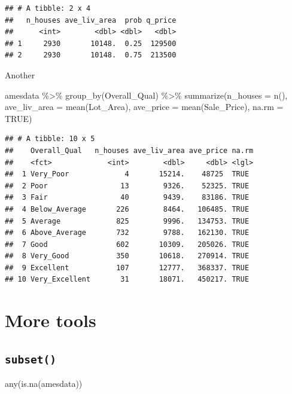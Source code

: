 \documentclass[
]{book}
\newenvironment{Shaded}{\begin{snugshade}}{\end{snugshade}}
\newcommand{\AttributeTok}[1]{\textcolor[rgb]{0.77,0.63,0.00}{#1}}
\newcommand{\ConstantTok}[1]{\textcolor[rgb]{0.00,0.00,0.00}{#1}}
\newcommand{\FunctionTok}[1]{\textcolor[rgb]{0.00,0.00,0.00}{#1}}
\newcommand{\NormalTok}[1]{#1}
\newcommand{\SpecialCharTok}[1]{\textcolor[rgb]{0.00,0.00,0.00}{#1}}
\theoremstyle{definition}
\theoremstyle{definition}
\theoremstyle{definition}
\theoremstyle{definition}
\theoremstyle{remark}
\begin{document}
\begin{verbatim}
## # A tibble: 2 x 4
##   n_houses ave_liv_area  prob q_price
##      <int>        <dbl> <dbl>   <dbl>
## 1     2930       10148.  0.25  129500
## 2     2930       10148.  0.75  213500
\end{verbatim}

Another

\begin{Shaded}
\begin{Highlighting}[]
\NormalTok{amesdata }\SpecialCharTok{\%\textgreater{}\%} 
  \FunctionTok{group\_by}\NormalTok{(Overall\_Qual) }\SpecialCharTok{\%\textgreater{}\%} 
  \FunctionTok{summarize}\NormalTok{(}\AttributeTok{n\_houses =} \FunctionTok{n}\NormalTok{(),}
            \AttributeTok{ave\_liv\_area =} \FunctionTok{mean}\NormalTok{(Lot\_Area),}
            \AttributeTok{ave\_price =} \FunctionTok{mean}\NormalTok{(Sale\_Price),}
            \AttributeTok{na.rm =} \ConstantTok{TRUE}\NormalTok{)}
\end{Highlighting}
\end{Shaded}

\begin{verbatim}
## # A tibble: 10 x 5
##    Overall_Qual   n_houses ave_liv_area ave_price na.rm
##    <fct>             <int>        <dbl>     <dbl> <lgl>
##  1 Very_Poor             4       15214.    48725  TRUE 
##  2 Poor                 13        9326.    52325. TRUE 
##  3 Fair                 40        9439.    83186. TRUE 
##  4 Below_Average       226        8464.   106485. TRUE 
##  5 Average             825        9996.   134753. TRUE 
##  6 Above_Average       732        9788.   162130. TRUE 
##  7 Good                602       10309.   205026. TRUE 
##  8 Very_Good           350       10618.   270914. TRUE 
##  9 Excellent           107       12777.   368337. TRUE 
## 10 Very_Excellent       31       18071.   450217. TRUE
\end{verbatim}

\hypertarget{more-tools}{%
\section{More tools}\label{more-tools}}

\hypertarget{subset}{%
\subsection{\texorpdfstring{\texttt{subset()}}{subset()}}\label{subset}}

\begin{Shaded}
\begin{Highlighting}[]
\FunctionTok{any}\NormalTok{(}\FunctionTok{is.na}\NormalTok{(amesdata))}
\end{Highlighting}
\end{Shaded}
\end{document}
